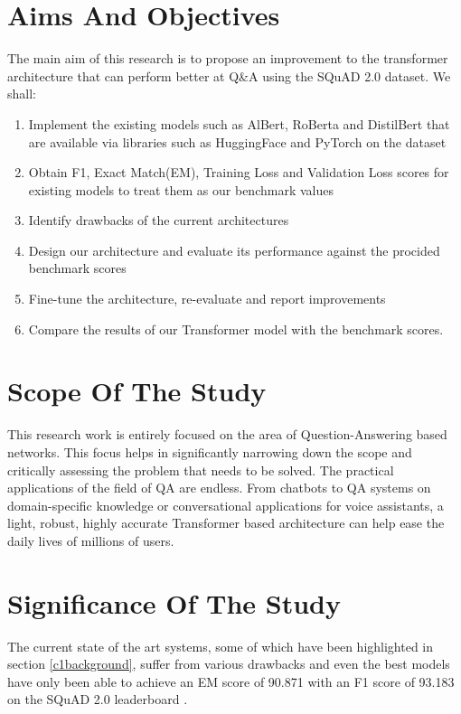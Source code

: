 \documentclass[a4paper,12pt]{report}
\begin{document}
        \section{Aims And Objectives}\label{12}
        	The main aim of this research is to propose an improvement to the transformer architecture that can perform better at Q\&A using the SQuAD 2.0 dataset.
        We shall:
        \begin{enumerate}
        	\item Implement the existing models such as AlBert, RoBerta and DistilBert that are available via libraries such as HuggingFace \citep{hfTransformers} and PyTorch  on the dataset
        	\item Obtain F1, Exact Match(EM), Training Loss and Validation Loss scores for existing models to treat them as our benchmark values
        	\item Identify drawbacks of the current architectures
        	\item Design our architecture and evaluate its performance against the procided benchmark scores
        	\item Fine-tune the architecture, re-evaluate and report improvements
        	\item Compare the results of our Transformer model with the benchmark scores.
        \end{enumerate}

        \section{Scope Of The Study}\label{13}

        This research work is entirely focused on the area of Question-Answering based networks. This focus helps in significantly narrowing down the scope and critically assessing the problem that needs to be solved. The practical applications of the field of QA are endless. From chatbots to QA systems on domain-specific knowledge or conversational applications for voice assistants, a light, robust, highly accurate Transformer based architecture can help ease the daily lives of millions of users.
        \section{Significance Of The Study}\label{14}

        The current state of the art systems, some of which have been highlighted in section \ref{c1background}, suffer from various drawbacks and even the best models have only been able to achieve an EM score of 90.871 with an F1 score of 93.183 on the SQuAD 2.0 leaderboard \citep{squad}.
\end{document}
